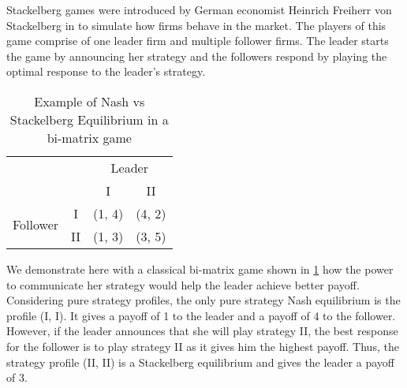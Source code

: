 
Stackelberg games were introduced by German economist Heinrich Freiherr von Stackelberg in \cite{S34} to simulate how firms behave in the market. The players of this game comprise of one leader firm and multiple follower firms. The leader starts the game by announcing her strategy and the followers respond by playing the optimal response to the leader's strategy.

\begin{table}[]
    \centering
    \begin{tabular}{ll|c|c|}
        \cline{3-4}
        & & \multicolumn{2}{c|}{Leader} \\ 
        \cline{3-4} 
        & & I & II \\ 
        \hline
        \multicolumn{1}{|c|}{\multirow{2}{*}{Follower}} & \multicolumn{1}{c|}{I}  & (1, 4) & (4, 2)\\ 
        \cline{2-4} 
        \multicolumn{1}{|c|}{} & \multicolumn{1}{c|}{II} & (1, 3) & (3, 5) \\
        \hline
    \end{tabular}
    \caption{Example of Nash vs Stackelberg Equilibrium in a bi-matrix game}
    \label{tab:bi-matrix-game}
\end{table}

We demonstrate here with a classical bi-matrix game shown in \cref{tab:bi-matrix-game} how the power to communicate her strategy would help the leader achieve better payoff. Considering pure strategy profiles, the only pure strategy Nash equilibrium is the profile (I, I). It gives a payoff of 1 to the leader and a payoff of 4 to the follower. However, if the leader announces that she will play strategy II, the best response for the follower is to play strategy II as it gives him the highest payoff. Thus, the strategy profile (II, II) is a Stackelberg equilibrium and gives the leader a payoff of 3.

